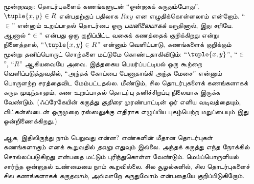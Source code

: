 \documentclass[../../../include/open-logic-section]{subfiles}
\begin{document}
மூன்றாவது: தொடர்புகளைக் கணங்களுடன் ``ஒன்றாகக் கருதும்போது'',
$\tuple{x,y} \in R$ என்பதற்குப் பதிலாக $Rxy$ என எழுதிக்கொள்ளலாம் என்றோம்.
``$\in$'' என்னும் உறுப்பாதல் தொடர்பை ஒரு \emph{பயனிலையாகக்} கருதினால்,
இது சரியே. ஆனால் ``$\in$'' என்பது ஒரு குறிப்பிட்ட வகைக் கணத்தைக் குறிக்கிறது
என்று நினைத்தால், ``$\tuple{x,y} \in R$'' என்னும் வெளிப்பாடு,
கணங்களைக் குறிக்கும் மூன்று தனிப்பொருட் சொற்களை மட்டுமே கொண்டதாகிவிடும்:
``$\tuple{x,y}$'', ``$\in$'', ``$R$'' ஆகியவையே அவை.
இத்தகைய பெயர்ப்பட்டியல் ஒரு கூற்றை வெளிப்படுத்துவதில்,
``அந்தக் கோப்பை பேனாதாங்கி அந்த மேசை'' என்னும் பொருளற்ற சரத்தைவிட
மேம்பட்டதல்ல. மீண்டும், சில தொடர்புகளைக் கணங்களாகக் கருத முடிந்தாலும்,
கண-உறுப்பாதல் தொடர்பு தனிச்சிறப்பு நிலையாக இருக்க வேண்டும்.
(ஃப்ரேகேயின் கருத்து \emph{குதிரை} முரண்பாட்டின் ஓர் எளிய வடிவத்தையும்,
விட்கன்ஸ்டைன் ஒருமுறை ரஸ்ஸலுக்கு எதிராக எழுப்பிய புகழ்பெற்ற
மறுப்பையும் இது ஒன்றிணைக்கிறது.)

ஆக, இதிலிருந்து நாம் பெறுவது என்ன?
எண்களின் மீதான தொடர்புகள் கணங்களாகும் எனக் கூறுவதில்
\emph{தவறு} எதுவும் இல்லை. அந்தக் கருத்து எந்த நோக்கில் சொல்லப்படுகிறது
என்பதை மட்டும் புரிந்துகொள்ள வேண்டும்.
மெய்ப்பொருளியல் சார்ந்த ஒன்றாதல் உண்மையை நாம் கூறவில்லை.
சில சூழல்களில், சில தொடர்புகளைச் சில கணங்களாகக்
\emph{கருதலாம்}, அவ்வாறே கருதுவோம் என்பதையே குறிப்பிடுகிறோம்.
\end{document}

